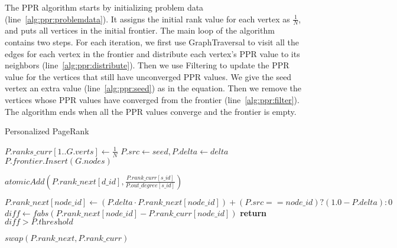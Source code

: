 \documentclass{article}
\begin{document}
The PPR algorithm starts by initializing problem data
(line~\ref{alg:ppr:problemdata}). It assigns the initial rank value for
each vertex as $\frac{1}{N}$, and puts all vertices in the initial
frontier. The main loop of the algorithm contains two steps. For each
iteration, we first use GraphTraversal to visit all the edges for each
vertex in the frontier and distribute each vertex's PPR value to its
neighbors (line~\ref{alg:ppr:distribute}). Then we use Filtering to update
the PPR value for the vertices that still have unconverged PPR values. We
give the seed vertex an extra value (line~\ref{alg:ppr:seed}) as in the
equation. Then we remove the vertices whose PPR values have converged from
the frontier (line~\ref{alg:ppr:filter}). The algorithm ends when all the
PPR values converge and the frontier is empty.

\begin{algorithm}
  \caption{Personalized PageRank} \label{alg:ppr}
  \begin{algorithmic}[1]
     \label{alg:ppr:problemdata}
      \State $P.\textit{ranks\_curr}[1..G.\textit{verts}] \gets \frac{1}{N}$
      \State $P.\textit{src} \gets \textit{seed}, P.\textit{delta} \gets \textit{delta}$
      \State $P.\textit{frontier.Insert}(G.\textit{nodes})$
    \EndProcedure

      \State $\textit{atomicAdd}(P.\textit{rank\_next}[d\_\textit{id}],\frac{P.\textit{rank\_curr}[s\_\textit{id}]}{P.\textit{out\_degree}[s\_\textit{id}]})$ \label{alg:ppr:distribute}
    \EndProcedure

      \State $P.\textit{rank}\_\textit{next}[\textit{node}\_\textit{id}] \gets (P.\textit{delta} \cdot P.\textit{rank}\_\textit{next}[\textit{node}\_\textit{id}]) + (P.\textit{src} == \textit{node}\_\textit{id}) ? (1.0 - P.\textit{delta}) : 0$ \label{alg:ppr:seed}
      \State $\textit{diff} \gets \textit{fabs}(P.\textit{rank\_next}[\textit{node\_id}]-P.\textit{rank\_curr}[\textit{node}\_\textit{id}])$
      \State \textbf{return} $\textit{diff} > P.\textit{threshold}$ \label{alg:ppr:filter}
    \EndProcedure

      \State {}
        \State {}
        \State {}
        \State $swap(P.\textit{rank\_next}, P.\textit{rank\_curr})$
      \EndWhile
    \EndProcedure
  \end{algorithmic}
\end{algorithm}
\end{document}
